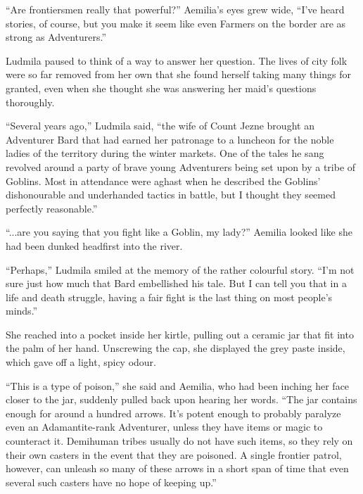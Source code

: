  

“Are frontiersmen really that powerful?” Aemilia’s eyes grew wide, “I’ve heard stories, of course, but you make it seem like even Farmers on the border are as strong as Adventurers.”

 

Ludmila paused to think of a way to answer her question. The lives of city folk were so far removed from her own that she found herself taking many things for granted, even when she thought she was answering her maid’s questions thoroughly.

 

“Several years ago,” Ludmila said, “the wife of Count Jezne brought an Adventurer Bard that had earned her patronage to a luncheon for the noble ladies of the territory during the winter markets. One of the tales he sang revolved around a party of brave young Adventurers being set upon by a tribe of Goblins. Most in attendance were aghast when he described the Goblins’ dishonourable and underhanded tactics in battle, but I thought they seemed perfectly reasonable.”

 

“...are you saying that you fight like a Goblin, my lady?” Aemilia looked like she had been dunked headfirst into the river.

 

“Perhaps,” Ludmila smiled at the memory of the rather colourful story. “I’m not sure just how much that Bard embellished his tale. But I can tell you that in a life and death struggle, having a fair fight is the last thing on most people’s minds.”

 

She reached into a pocket inside her kirtle, pulling out a ceramic jar that fit into the palm of her hand. Unscrewing the cap, she displayed the grey paste inside, which gave off a light, spicy odour.

 

“This is a type of poison,” she said and Aemilia, who had been inching her face closer to the jar, suddenly pulled back upon hearing her words. “The jar contains enough for around a hundred arrows. It’s potent enough to probably paralyze even an Adamantite-rank Adventurer, unless they have items or magic to counteract it. Demihuman tribes usually do not have such items, so they rely on their own casters in the event that they are poisoned. A single frontier patrol, however, can unleash so many of these arrows in a short span of time that even several such casters have no hope of keeping up.”

